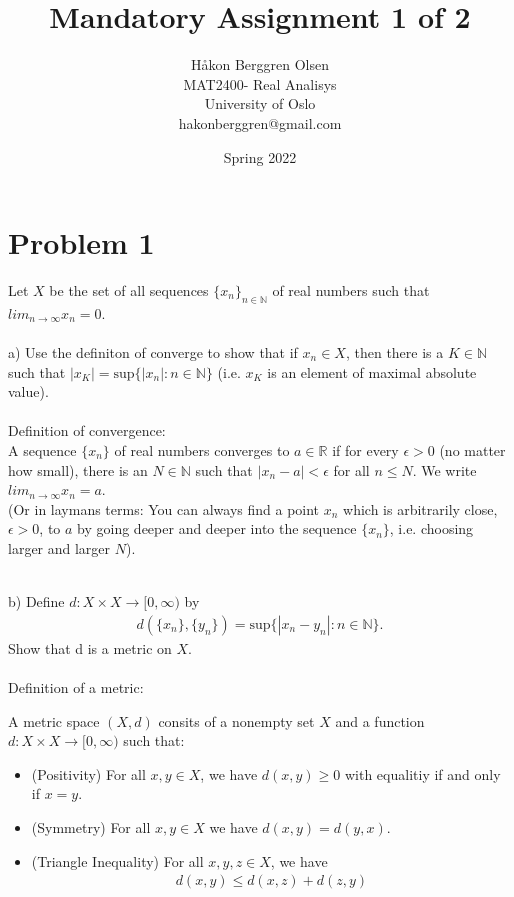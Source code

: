 \documentclass[12pt,letterpaper]{article}
\title{Mandatory Assignment 1 of 2}
\author{Håkon Berggren Olsen\\
  \small{MAT2400- Real Analisys}\\
  \small{University of Oslo}\\
  \small{hakonberggren@gmail.com}
}
\date{Spring 2022}
\begin{document}
\maketitle
\newpage 
 
\section*{Problem 1}
 
 Let $X$ be the set of all sequences $\{x_n\}_{n\in \mathbb{N}}$ of real numbers such that $lim_{n\to \infty} x_n = 0$.\\
 \noindent \\
 a) Use the definiton of converge to show that if ${x_n}\in X$, then there is a $K\in \mathbb{N}$ such that $|x_K|=\text{sup}\{|x_n| : n\in \mathbb{N} \}$ (i.e. $x_K$ is an element of maximal absolute value).\\
 \noindent \\
 
 Definition of convergence:\\
 A sequence $\{x_n\}$ of real numbers converges to $a\in\mathbb{R}$ if for every $\epsilon >0$ (no matter how small), there is an $N\in\mathbb{N}$ such that $|x_n-a|<\epsilon$ for all $n\le N$. We write $lim_{n \to \infty} x_n = a$.\\
 
 (Or in laymans terms: You can always find a point $x_n$ which is arbitrarily close, $\epsilon>0$, to $a$ by going deeper and deeper into the sequence $\{x_n\}$, i.e. choosing larger and larger $N$).
 
 \noindent \\
 b) Define $d: X \times X \to [0, \infty)$ by
\begin{align*}
 	d(\{x_n\}, \{y_n\}) = \text{sup}\{|x_n-y_n| : n\in \mathbb{N}\}. 
\end{align*}
 Show that d is a metric on $X$.\\
 \noindent \\
 Definition of a metric:
 
 A metric space $(X,d)$ consits of a nonempty set $X$ and a function $d: X \times X \to [0,\infty)$ such that:
 \begin{itemize}
 	\item (Positivity) For all $x,y\in X$, we have $d(x,y)\ge 0$ with equalitiy if and only if $x=y$.
 	\item (Symmetry) For all $x,y \in X$ we have $d(x,y)=d(y,x)$. 
 	\item (Triangle Inequality) For all $x,y,z \in X$, we have
 		\begin{align*}
 			d(x,y) \le d(x,z)+d(z,y)
 		\end{align*}
 \end{itemize}
 
\end{document}
